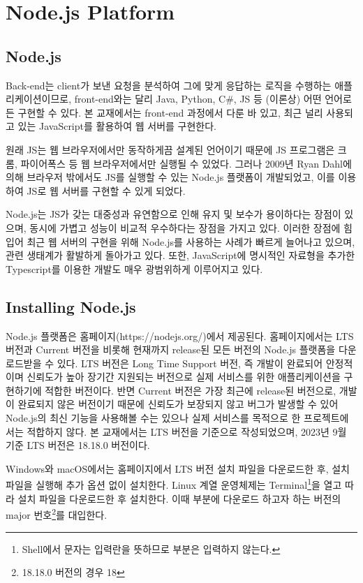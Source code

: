 \section{Node.js Platform}\label{sect:node-js}

\subsection*{Node.js}

Back-end는 client가 보낸 요청을 분석하여 그에 맞게 응답하는 로직을 수행하는 애플리케이션이므로, front-end와는 달리 Java, Python, C\#, JS 등 (이론상) 어떤 언어로든 구현할 수 있다. 본 교재에서는 front-end 과정에서 다룬 바 있고, 최근 널리 사용되고 있는 JavaScript를 활용하여 웹 서버를 구현한다.

원래 JS는 웹 브라우저에서만 동작하게끔 설계된 언어이기 때문에 JS 프로그램은 크롬, 파이어폭스 등 웹 브라우저에서만 실행될 수 있었다. 그러나 2009년 Ryan Dahl에 의해 브라우저 밖에서도 JS를 실행할 수 있는 Node.js 플랫폼이 개발되었고, 이를 이용하여 JS로 웹 서버를 구현할 수 있게 되었다.

Node.js는 JS가 갖는 대중성과 유연함으로 인해 유지 및 보수가 용이하다는 장점이 있으며, 동시에 가볍고 성능이 비교적 우수하다는 장점을 가지고 있다. 이러한 장점에 힘입어 최근 웹 서버의 구현을 위해 Node.js를 사용하는 사례가 빠르게 늘어나고 있으며, 관련 생태계가 활발하게 돌아가고 있다. 또한, JavaScript에 명시적인 자료형을 추가한 Typescript를 이용한 개발도 매우 광범위하게 이루어지고 있다.

\subsection*{Installing Node.js}

Node.js 플랫폼은 홈페이지(https://nodejs.org/)에서 제공된다. 홈페이지에서는 LTS 버전과 Current 버전을 비롯해 현재까지 release된 모든 버전의 Node.js 플랫폼을 다운로드받을 수 있다. LTS 버전은 Long Time Support 버전, 즉 개발이 완료되어 안정적이며 신뢰도가 높아 장기간 지원되는 버전으로 실제 서비스를 위한 애플리케이션을 구현하기에 적합한 버전이다. 반면 Current 버전은 가장 최근에 release된 버전으로, 개발이 완료되지 않은 버전이기 때문에 신뢰도가 보장되지 않고 버그가 발생할 수 있어 Node.js의 최신 기능을 사용해볼 수는 있으나 실제 서비스를 목적으로 한 프로젝트에서는 적합하지 않다. 본 교재에서는 LTS 버전을 기준으로 작성되었으며, 2023년 9월 기준 LTS 버전은 18.18.0 버전이다.

Windows와 macOS에서는 홈페이지에서 LTS 버전 설치 파일을 다운로드한 후, 설치 파일을 실행해 추가 옵션 없이 설치한다. Linux 계열 운영체제는 Terminal\footnote{Shell에서 \cd{\$} 문자는 입력란을 뜻하므로 \cd{\$ } 부분은 입력하지 않는다.}을 열고 \을 따라 설치 파일을 다운로드한 후 설치한다. 이때  부분에 다운로드 하고자 하는 버전의 major 번호\footnote{18.18.0 버전의 경우 18}를 대입한다.


